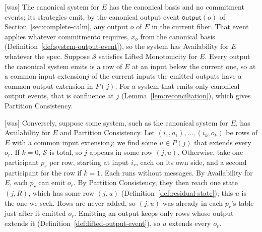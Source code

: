 \documentclass[sigconf]{cidr-2027}
\theoremstyle{remark}
\newcommand{\commitment}{commitment\xspace}
\newcommand{\indesc}{input extension\xspace} %
\newcommand{\outrel}{extends\xspace}          %
\newcommand{\outnoun}{output extension\xspace}%
\newcommand{\Spec}{\mathcal{S}}
\newcommand{\fiber}[1]{P(#1)}
\begin{document}
{\footnotesize\color{black!50}\noindent\textsf{[was]} The canonical system for $E$ has the canonical basis and no \commitment
events; its strategies emit, by the canonical output event $\mathsf{output}(o)$
of Section~\ref{sec:complete-calm}, any output $o$ of $E$ in the current fiber.
That event applies whatever \commitment $o$ requires, $x_o$ from the
canonical basis (Definition~\ref{def:system-output-event}), so the system has
Availability for $E$ whatever the spec.  Suppose $\Spec$ satisfies Lifted
Monotonicity for $E$.  Every output the canonical system emits is a row of $E$ at an input below
the current one, so at a common \indesc $j$ of the current inputs the emitted
outputs have a common \outnoun in $\fiber{j}$.  For a system that emits only
canonical output events, that is confluence at $j$
(Lemma~\ref{lem:reconciliation}), which gives Partition Consistency.\par}



{\footnotesize\color{black!50}\noindent\textsf{[was]} Conversely, suppose some system, such as the canonical system for $E$, has
Availability for $E$ and Partition Consistency.  Let $(i_1,o_1),\ldots,(i_k,o_k)$ be rows of $E$ with a common
\indesc $j$; we find some $u\in\fiber{j}$ that \outrel every $o_r$.  If $k=0$,
$\Spec$ is total, so $j$ appears in some row $(j,u)$.  Otherwise, take one
participant $p_r$ per row, starting at input $i_r$, each on its own side,
and a second participant for the row if $k=1$.  Each runs without messages.
By Availability for $E$, each $p_r$ can emit $o_r$.  By Partition Consistency,
they then reach one state $(j,R)$, which has some row $(j,u)$
(Definition~\ref{def:residual-state}); this $u$ is the one we seek.  Rows are
never added, so $(j,u)$ was already in each $p_r$'s table just after it
emitted $o_r$.  Emitting an output keeps only rows whose output \outrel it
(Definition~\ref{def:lifted-output-event}), so $u$ \outrel every
$o_r$.\par}
\end{document}
